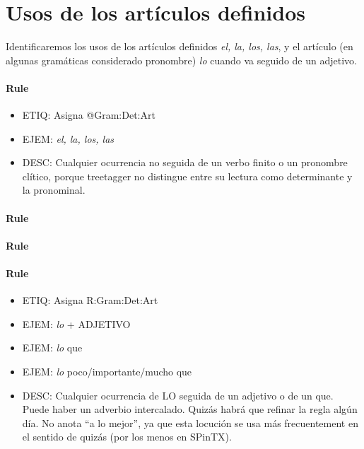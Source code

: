 \documentclass[11pt]{report}
\begin{document}
\section{Usos de los artículos definidos}
Identificaremos los usos de los artículos definidos \emph{el, la, los, las}, y el artículo (en algunas gramáticas considerado pronombre) \emph{lo} cuando va seguido de un adjetivo.

\paragraph*{Rule}
\begin{itemize}
\item ETIQ: Asigna @Gram:Det:Art
\item EJEM: \emph{el, la, los, las}
\item DESC: Cualquier ocurrencia no seguida de un verbo finito o un pronombre clítico, porque treetagger no distingue entre su lectura como determinante y la pronominal.
\end{itemize}

\paragraph*{Rule}
\paragraph*{Rule}
\paragraph*{Rule}
\begin{itemize}
\item ETIQ: Asigna R:Gram:Det:Art
\item EJEM: \emph{lo} + ADJETIVO 
\item EJEM: \emph{lo} que 
\item EJEM: \emph{lo} poco/importante/mucho que 
\item DESC: Cualquier ocurrencia de LO seguida de un adjetivo o de un que. Puede haber un adverbio intercalado. Quizás habrá que refinar la regla algún día. No anota ``a lo mejor'', ya que esta locución se usa más frecuentement en el sentido de quizás (por los menos en SPinTX).
\end{itemize}
\end{document}
